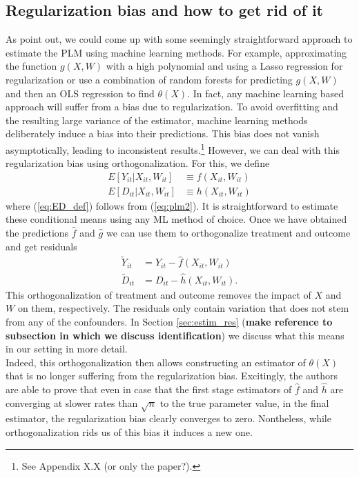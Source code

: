 \subsection{Regularization bias and how to get rid of it}
As \cite{DML2017} point out, we could come up with some seemingly straightforward approach to estimate the PLM using machine learning methods. For example, approximating the function $g(X, W)$ with a high polynomial and using a Lasso regression for regularization or use a combination of random forests for predicting $g(X, W)$ and then an OLS regression to find $\theta(X)$. In fact, any machine learning based approach will suffer from a bias due to regularization. To avoid overfitting and the resulting large variance of the estimator, machine learning methods deliberately induce a bias into their predictions. This bias does not vanish asymptotically, leading to inconsistent results.\footnote{See Appendix X.X (or only the paper?).} However, we can deal with this regularization bias using orthogonalization. For this, we define 
\begin{align}
    E[Y_{it}|X_{it}, W_{it}] &\equiv f(X_{it}, W_{it}) \label{eq:EY_def}\\ 
    E[D_{it}|X_{it}, W_{it}] &\equiv h(X_{it}, W_{it}) \label{eq:ED_def}
\end{align}
where (\ref{eq:ED_def}) follows from (\ref{eq:plm2}). It is straightforward to estimate these conditional means using any ML method of choice. Once we have obtained the predictions $\hat{f}$ and $\hat{g}$ we can use them to orthogonalize treatment and outcome and get residuals
\begin{align*} 
    \tilde{Y}_{it}&=Y_{it}-\hat{f}(X_{it}, W_{it}) \\ 
    \tilde{D}_{it}&=D_{it}-\hat{h}(X_{it}, W_{it}).
\end{align*}
This orthogonalization of treatment and outcome removes the impact of $X$ and $W$ on them, respectively. The residuals only contain variation that does not stem from any of the confounders. In Section \ref{sec:estim_res} (\textbf{make reference to subsection in which we discuss identification}) we discuss what this means in our setting in more detail. \\
Indeed, this orthogonalization then allows constructing an estimator of $\theta(X)$ that is no longer suffering from the regularization bias. Excitingly, the authors are able to prove that even in case that the first stage estimators of $\hat{f}$ and $\hat{h}$ are converging at slower rates than $\sqrt{n}$ to the true parameter value, in the final estimator, the regularization bias clearly converges to zero. Nontheless, while orthogonalization rids us of this bias it induces a new one. 


